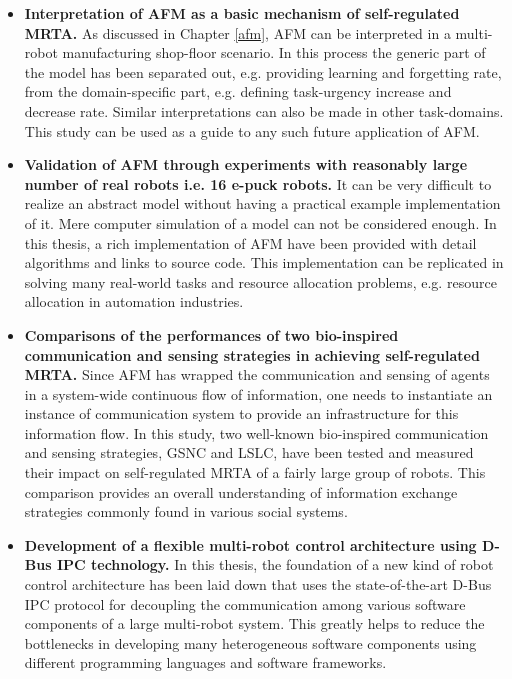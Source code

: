 \begin{itemize}
\item \textbf{Interpretation of AFM as a basic mechanism of self-regulated MRTA.} As discussed in Chapter \ref{afm}, AFM can be  interpreted in a multi-robot manufacturing shop-floor scenario.  In this process  the generic part of the model has been separated out, e.g. providing learning and forgetting rate, from the domain-specific part, e.g. defining task-urgency increase and decrease rate. Similar interpretations can also be made in other task-domains. This study can be used as a guide to any such future application of AFM.
%
\item \textbf{Validation of AFM through experiments with reasonably large number of real robots i.e. 16 e-puck robots.} It can be very difficult to realize an abstract model without having a practical example implementation of it. Mere computer simulation of a model can not be considered enough. In this thesis,  a rich implementation of AFM  have been provided with detail algorithms and links to source code. This implementation can be replicated in solving many real-world tasks and resource allocation problems, e.g. resource allocation in automation industries.
%
\item \textbf{Comparisons of the performances of two bio-inspired communication and sensing strategies in achieving self-regulated MRTA.} Since AFM has wrapped the communication and sensing of agents  in a system-wide continuous flow of information, one needs to instantiate an instance of communication system to provide an infrastructure for this information flow. In this study,  two well-known bio-inspired  communication and sensing strategies, GSNC and LSLC, have been tested and measured their impact on self-regulated MRTA of a fairly large group of robots. This comparison provides an overall understanding of information exchange strategies commonly found in various social systems.
%
\item \textbf{Development of a flexible multi-robot control architecture using D-Bus IPC technology.} In this thesis,  the foundation of a new kind of robot control architecture has been laid down that uses the state-of-the-art D-Bus IPC protocol for decoupling the communication among various software components of a large multi-robot system. This greatly helps to reduce the bottlenecks in developing many heterogeneous software components using different programming languages and software frameworks.
%

\end{itemize}
